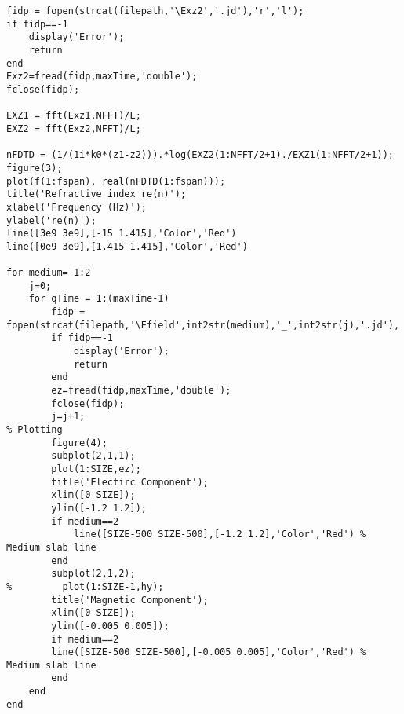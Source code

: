 \begin{lstlisting}
fidp = fopen(strcat(filepath,'\Exz2','.jd'),'r','l');
if fidp==-1
    display('Error');
    return
end
Exz2=fread(fidp,maxTime,'double');
fclose(fidp);

EXZ1 = fft(Exz1,NFFT)/L;
EXZ2 = fft(Exz2,NFFT)/L;

nFDTD = (1/(1i*k0*(z1-z2))).*log(EXZ2(1:NFFT/2+1)./EXZ1(1:NFFT/2+1));
figure(3);
plot(f(1:fspan), real(nFDTD(1:fspan)));
title('Refractive index re(n)');
xlabel('Frequency (Hz)');
ylabel('re(n)');
line([3e9 3e9],[-15 1.415],'Color','Red')
line([0e9 3e9],[1.415 1.415],'Color','Red')

for medium= 1:2
    j=0;
    for qTime = 1:(maxTime-1)
        fidp = fopen(strcat(filepath,'\Efield',int2str(medium),'_',int2str(j),'.jd'),'r','l');
        if fidp==-1
            display('Error');
            return
        end
        ez=fread(fidp,maxTime,'double');
        fclose(fidp);
        j=j+1;
% Plotting
        figure(4);
        subplot(2,1,1);
        plot(1:SIZE,ez);
        title('Electirc Component');
        xlim([0 SIZE]);
        ylim([-1.2 1.2]);
        if medium==2
            line([SIZE-500 SIZE-500],[-1.2 1.2],'Color','Red') % Medium slab line
        end
        subplot(2,1,2);
%         plot(1:SIZE-1,hy);
        title('Magnetic Component');
        xlim([0 SIZE]);
        ylim([-0.005 0.005]);
        if medium==2
        line([SIZE-500 SIZE-500],[-0.005 0.005],'Color','Red') % Medium slab line
        end
    end
end
\end{lstlisting}

